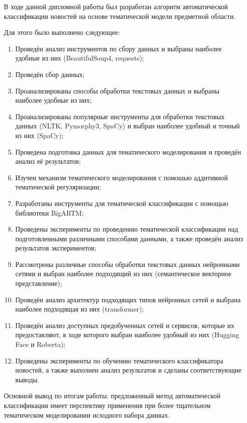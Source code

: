 \documentclass[autoref]{SCWorks}
\begin{document}
\conclusion
В ходе данной дипломной работы был разработан алгоритм автоматической
классификации новостей на основе тематической модели предметной области.

Для этого было выполнено следующее:

\begin{enumerate}
    \item Проведён анализ инструментов по сбору данных и выбраны
    наиболее удобные из них (BeautifulSoup4, requests);
    \item Проведён сбор данных;
    \item Проанализированы способы обработки текстовых данных
    и выбраны наиболее удобные из них;
    \item Проанализированы популярные инструменты для обработки
    текстовых данных (NLTK, Pymorphy3, SpaCy) и выбран наиболее
    удобный и точный из них (SpaCy);
    \item Проведена подготовка данных для тематического моделирования и
    проведён анализ её результатов;
    \item Изучен механизм тематического моделирования с помошью
    аддитивной тематической регуляризации;
    \item Разработаны инструменты для тематической классификации с
    помощью библиотеки BigARTM;
    \item Проведены эксперименты по проведению тематической классификации
    над подготовленными различными способами данными, а также
    проведён анализ результатов экспериментов;
    \item Рассмотрены различные способы обработки текстовых данных нейронными
    сетями и выбран наиболее подходящий из них (семантическое векторное
    представление);
    \item Проведён анализ архитектур подходящих типов нейронных сетей
    и выбрана наиболее подходящая из них (transformer);
    \item Проведён анализ доступных предобученных сетей и сервисов, которые
    их предоставляют, в ходе которого выбран наиболее удобный из них (Hugging
    Face и Roberta);
    \item Проведены эксперименты по обучению тематического классификатора
    новостей, а также выполнен анализ результатов и сделаны соответствующие
    выводы.
\end{enumerate}

Основной вывод по итогам работы: предложенный метод автоматической классификации
имеет перспективу применения при более тщательном тематическом моделировании
исходного набора данных.
\end{document}
